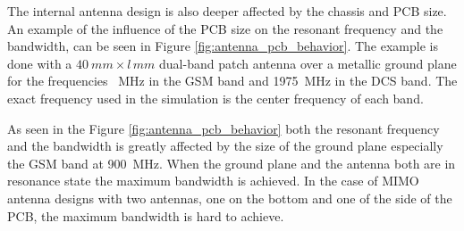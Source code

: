 The internal antenna design is also deeper affected by the chassis and PCB size\cite{sanchez2008multiband}. An example of the influence of the PCB size on the resonant frequency and the bandwidth, can be seen in Figure \ref{fig:antenna_pcb_behavior}. The example is done with a $\SI{40}{mm} \times l\,\si{mm}$ dual-band patch antenna over a metallic ground plane for the frequencies \SI{}{MHz} in the GSM band and \SI{1975}{MHz} in the DCS band. The exact frequency used in the simulation is the center frequency of each band. 

As seen in the Figure \ref{fig:antenna_pcb_behavior} both the resonant frequency and the bandwidth is greatly affected by the size of the ground plane especially the GSM band at \SI{900}{MHz}. When the ground plane and the antenna both are in resonance state the maximum bandwidth is achieved. In the case of MIMO antenna designs with two antennas, one on the bottom and one of the side of the PCB, the maximum bandwidth is hard to achieve\cite{sanchez2008multiband}. 

